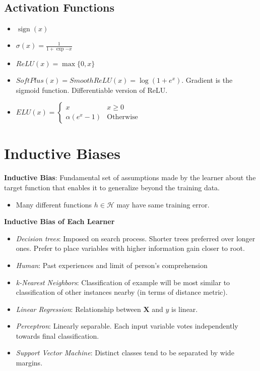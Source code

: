 \documentclass[10pt]{article}
\DeclareMathOperator*{\sign}{sign}
\begin{document}
\begin{multicols}{3}
  \subsection*{Activation Functions}

  \begin{itemize}
    \item $\sign(x)$
    \item $\sigma(x) = \frac{1}{1+\exp{-x}}$
    \item $ReLU(x) = \max\{0,x\}$
    \item $SoftPlus(x) = SmoothReLU(x) = \log(1+e^{x})$. Gradient is the sigmoid function. Differentiable version of ReLU\@.
    \item $ELU(x)= \begin{cases}
                      x & x \geq 0 \\
                      \alpha(e^{x} - 1) & \text{Otherwise}
                    \end{cases}$
  \end{itemize}

  \section*{Inductive Biases}

  \textbf{Inductive Bias}: Fundamental set of assumptions made by the learner about the target function that enables it to generalize beyond the training data.
  \begin{itemize}
    \item Many different functions $h\in\mathcal{H}$ may have same training error.
  \end{itemize}

  \textbf{Inductive Bias of Each Learner}
  \begin{itemize}
    \item \textit{Decision trees}: Imposed on search process. Shorter trees preferred over longer ones. Prefer to place variables with higher information gain closer to root.
    \item \textit{Human}: Past experiences and limit of person's comprehension
    \item \textit{k-Nearest Neighbors}: Classification of example will be most similar to classification of other instances nearby (in terms of distance metric).
    \item \textit{Linear Regression}: Relationship between $\mathbf{X}$ and $y$ is linear.
    \item \textit{Perceptron}: Linearly separable.  Each input variable votes independently towards final classification.
    \item \textit{Support Vector Machine}: Distinct classes tend to be separated by wide margins.
  \end{itemize}


\end{multicols}
\end{document}

